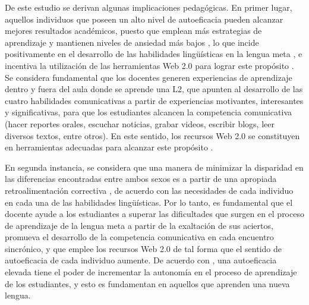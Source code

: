 \documentclass[spanish]{textolivre}
\begin{document}
De este estudio se derivan algunas implicaciones pedagógicas. En primer lugar, aquellos individuos que poseen un alto nivel de autoeficacia pueden alcanzar mejores resultados académicos, puesto que emplean más estrategias de aprendizaje y mantienen niveles de ansiedad más bajos \cite{hasan_effect_2019,zhu_relationship_2020}, lo que incide positivamente en el desarrollo de las habilidades lingüísticas en la lengua meta \cite{wang_self-efficacy_2013,alrabai_association_2018}, e incentiva la utilización de las herramientas Web 2.0 para lograr este propósito \cite{seleviciene_university_2015,csizer_gender-related_2024}. Se considera fundamental que los docentes generen experiencias de aprendizaje dentro y fuera del aula donde se aprende una L2, que apunten al desarrollo de las cuatro habilidades comunicativas a partir de experiencias motivantes, interesantes y significativas, para que los estudiantes alcancen la competencia comunicativa (hacer reportes orales, escuchar noticias, grabar videos, escribir blogs, leer diversos textos, entre otros). En este sentido, los recursos Web 2.0 se constituyen en herramientas adecuadas para alcanzar este propósito \cite{asiksoy_elt_2018,moussaoui_integration_2020,jarrah_arab_2021,ningsih_gender-based_2022}. 

En segunda instancia, se considera que una manera de minimizar la disparidad en las diferencias encontradas entre ambos sexos es a partir de una apropiada retroalimentación correctiva \cite{gomez_diferencias_2019}, de acuerdo con las necesidades de cada individuo en cada una de las habilidades lingüísticas. Por lo tanto, es fundamental que el docente ayude a los estudiantes a superar las dificultades que surgen en el proceso de aprendizaje de la lengua meta a partir de la exaltación de sus aciertos, promueva el desarrollo de la competencia comunicativa en cada encuentro sincrónico, y que emplee los recursos Web 2.0 de tal forma que el sentido de autoeficacia de cada individuo aumente. De acuerdo con \textcite{alrabai_association_2018}, una autoeficacia elevada tiene el poder de incrementar la autonomía en el proceso de aprendizaje de los estudiantes, y esto es fundamentan en aquellos que aprenden una nueva lengua. 
\end{document}
